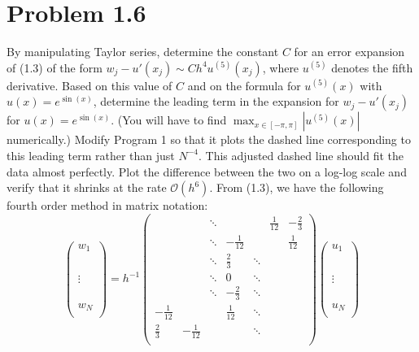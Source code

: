 \documentclass{article}
\begin{document}
\section*{Problem 1.6}
By manipulating Taylor series, determine the constant $C$ for an error expansion of (1.3) of the form $w_j - u'(x_j) \sim Ch^4u^{(5)}(x_j)$, where $u^{(5)}$ denotes the fifth derivative. Based on this value of $C$ and on the formula for $u^{(5)}(x)$ with $u(x) = e^{\sin(x)}$, determine the leading term in the expansion for $w_j - u'(x_j)$ for $u(x) = e^{\sin(x)}$. (You will have to find $\max_{x \in [-\pi, \pi]}|u^{(5)}(x)|$ numerically.) Modify Program 1 so that it plots the dashed line corresponding to this leading term rather than just $N^{-4}$. This adjusted dashed line should fit the data almost perfectly. Plot the difference between the two on a log-log scale and verify that it shrinks at the rate $\mathcal{O}(h^6)$.
\newline\newline
From (1.3), we have the following fourth order method in matrix notation:
\[
\begin{pmatrix}
    w_1 \\
    \\
    \\
    \\
    \\
    \vdots\\
    \\
    \\
    \\
    w_N\\

\end{pmatrix}
= h^{-1}\begin{pmatrix}
    & & \ddots & & & \frac{1}{12} & -\frac{2}{3} \\
    & & \ddots & -\frac{1}{12} & & & \frac{1}{12} \\
    & & \ddots & \frac{2}{3} & \ddots \\
    & & \ddots & 0 & \ddots \\
    & & \ddots & -\frac{2}{3} & \ddots \\
    -\frac{1}{12} & & & \frac{1}{12} & \ddots \\
    \frac{2}{3} & -\frac{1}{12} & & & \ddots \\
\end{pmatrix}
\begin{pmatrix}
    u_1\\
    \\
    \\
    \\
    \\
    \vdots\\
    \\
    \\
    \\
    u_N\\
\end{pmatrix}
\]
\end{document}
